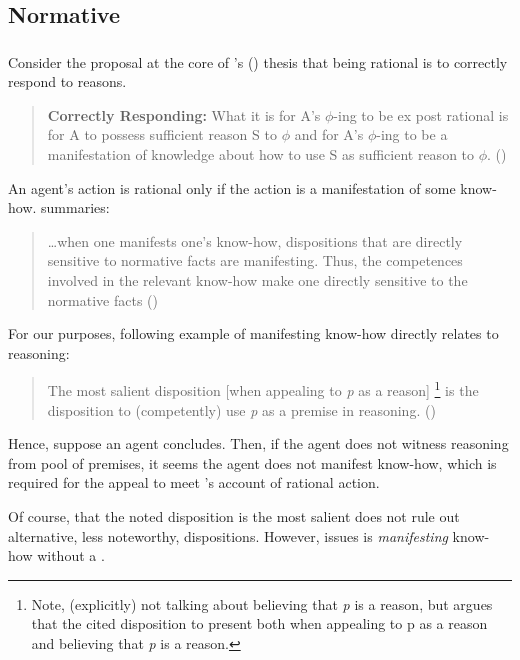 \subsection{Normative}

\subsubsection{\textcite{Lord:2018aa}}

\begin{note}
  Consider the proposal at the core of \citeauthor{Lord:2018aa}'s (\citeyear{Lord:2018aa}) thesis that being rational is to correctly respond to reasons.

  \begin{quote}
    \textbf{Correctly Responding:} What it is for A's \(\phi\)-ing to be ex post rational is for A to possess sufficient reason S to \(\phi\) and for A's \(\phi\)-ing to be a manifestation of knowledge about how to use S as sufficient reason to \(\phi\).%
    \mbox{}\hfill\mbox{(\citeyear[143]{Lord:2018aa})}
  \end{quote}

  An agent's action is rational only if the action is a manifestation of some know-how.
  \citeauthor{Lord:2018aa} summaries:

  \begin{quote}
    \dots when one manifests one's know-how, dispositions that are directly sensitive to normative facts are manifesting. Thus, the competences involved in the relevant know-how make one directly sensitive to the normative facts%
    \mbox{}\hfill\mbox{(\citeyear[16]{Lord:2018aa})}
  \end{quote}

  For our purposes, following example of manifesting know-how directly relates to reasoning:

  \begin{quote}
    The most salient disposition [when appealing to \emph{p} as a reason]%
    \footnote{
      Note, \citeauthor{Lord:2018aa} (explicitly) not talking about believing that \emph{p} is a reason, but argues that the cited disposition to present both when appealing to p as a reason and believing that \emph{p} is a reason.
    }
    is the disposition to (competently) use \emph{p} as a premise in reasoning.\newline
    \mbox{}\hfill\mbox{(\citeyear[25]{Lord:2018aa})}
  \end{quote}

  Hence, suppose an agent concludes.
  Then, if the agent does not witness reasoning from pool of premises, it seems the agent does not manifest know-how, which is required for the appeal to meet \citeauthor{Lord:2018aa}'s account of rational action.

  Of course, that the noted disposition is the most salient does not rule out alternative, less noteworthy, dispositions.
  However, issues is \emph{manifesting} know-how without a \wit{}.
\end{note}

